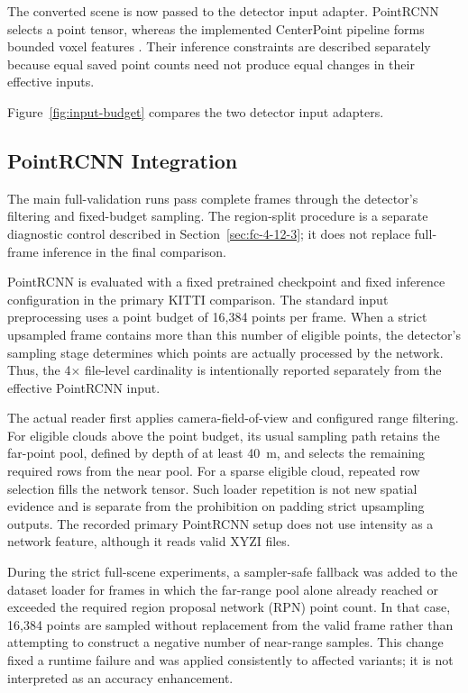 The converted scene is now passed to the detector input adapter.
PointRCNN selects a point tensor, whereas the implemented CenterPoint
pipeline forms bounded voxel features
\cite{shi2019pointrcnn,yin2021centerpoint}. Their inference constraints
are described separately because equal saved point counts need not
produce equal changes in their effective inputs.

Figure~\ref{fig:input-budget} compares the two detector input adapters.


\subsection{PointRCNN Integration}
\label{sec:fc-4-8-1}

The main full-validation runs pass complete frames through the detector's
filtering and fixed-budget sampling. The region-split procedure is a
separate diagnostic control described in
Section~\ref{sec:fc-4-12-3}; it does not replace full-frame inference in
the final comparison.

PointRCNN \cite{shi2019pointrcnn} is evaluated with a fixed pretrained checkpoint and fixed inference configuration in the primary KITTI comparison. The standard input preprocessing uses a point budget of 16,384 points per frame. When a strict upsampled frame contains more than this number of eligible points, the detector's sampling stage determines which points are actually processed by the network. Thus, the 4\ensuremath{\times}  file-level cardinality is intentionally reported separately from the effective PointRCNN input.

The actual reader first applies camera-field-of-view and configured
range filtering. For eligible clouds above the point budget, its
usual sampling path retains the far-point pool, defined by depth of
at least 40~m, and selects the remaining required rows from the near
pool. For a sparse eligible cloud, repeated row selection fills the
network tensor. Such loader repetition is not new spatial evidence
and is separate from the prohibition on padding strict upsampling
outputs. The recorded primary PointRCNN setup does not use intensity
as a network feature, although it reads valid XYZI files.

During the strict full-scene experiments, a sampler-safe fallback was added to the dataset loader for frames in which the far-range pool alone already reached or exceeded the required region proposal network (RPN) point count. In that case, 16,384 points are sampled without replacement from the valid frame rather than attempting to construct a negative number of near-range samples. This change fixed a runtime failure and was applied consistently to affected variants; it is not interpreted as an accuracy enhancement.

